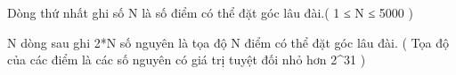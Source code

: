 Dòng thứ nhất ghi số N là số điểm có thể đặt góc lâu đài.( 1 ≤ N ≤ 5000 )


N dòng sau ghi 2*N số nguyên là tọa độ N điểm có thể đặt góc lâu đài. ( Tọa độ của các điểm là các số nguyên có giá trị tuyệt đối nhỏ hơn 2^31 )